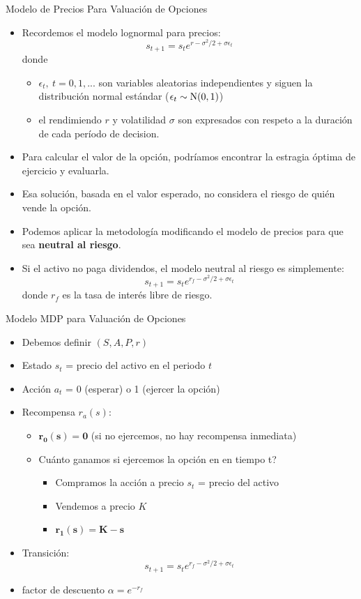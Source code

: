 \documentclass[handout]{beamer}
\begin{document}
\begin{frame}{Modelo de Precios Para Valuación de Opciones}
\begin{itemize}
\item Recordemos el modelo lognormal para precios:
$$s_{t+1} = s_t e^{r-\sigma^2/2+\sigma \epsilon_t}
$$
donde 
\begin{itemize}
\item $\epsilon_t,~t = 0,1,...$ son variables aleatorias independientes y siguen la distribución normal estándar ($\epsilon_t \sim {\rm N}(0,1)$)
\item el rendimiendo $r$ y volatilidad $\sigma$ son expresados con respeto a la duración de cada período de decision.
\end{itemize}
\item<2-> Para calcular el valor de la opción, podríamos encontrar la estragia óptima de ejercicio y evaluarla.
\item<3-> Esa solución, basada en el valor esperado, no considera el riesgo de quién vende la opción.
\item<4->Podemos aplicar la metodología modificando el modelo de precios para que sea \textbf{neutral al riesgo}.
\item<5-> Si el activo no paga dividendos, el modelo neutral al riesgo es simplemente:
$$s_{t+1} = s_t e^{r_f-\sigma^2/2+\sigma \epsilon_t}
$$
donde $r_f$ es la tasa de interés libre de riesgo.
\end{itemize}
\end{frame}

\begin{frame}{Modelo MDP para Valuación de Opciones}
\begin{itemize}
\item Debemos definir $(S,A,P,r)$
\item<2-> Estado $s_t$ = precio del activo en el periodo $t$ 
\item<3-> Acción $a_t$ = 0 (esperar) o 1 (ejercer la opción) 
\item<4-> Recompensa $r_a(s)$:
\begin{itemize}
\item<5-> $\mathbf{r_0(s) = 0}$ (si no ejercemos, no hay recompensa inmediata) 
\item<6-> Cuánto ganamos si ejercemos la opción en en tiempo t?
\begin{itemize}
\item<7-> Compramos la acción a precio $s_t$ = precio del activo 
\item<8-> Vendemos a precio $K$
\item<9-> $\mathbf{r_1(s) = K-s}$
\end{itemize}
\end{itemize}
\item<10-> Transición: 
$$s_{t+1} = s_t e^{r_f-\sigma^2/2+\sigma \epsilon_t}
$$
\item<11-> factor de descuento $\alpha = e^{-r_f}$
\end{itemize}
\end{frame}
\end{document}
